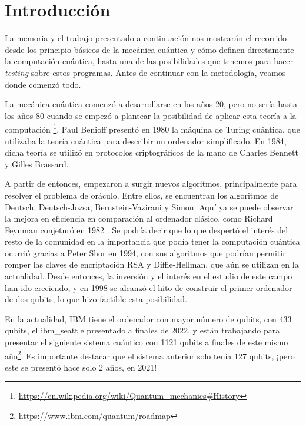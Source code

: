 \cleardoublepage

\chapter{Introducción}
\label{Cap1:Intro}
La memoria y el trabajo presentado a continuación nos mostrarán el recorrido desde los principio básicos de la mecánica cuántica y cómo definen directamente la computación cuántica, hasta una de las posibilidades que tenemos para hacer \textit{testing} sobre estos programas. Antes de continuar con la metodología, veamos donde comenzó todo. \newline

La mecánica cuántica comenzó a desarrollarse en los años 20, pero no sería hasta los años 80 cuando se empezó a plantear la posibilidad de aplicar esta teoría a la computación \cite{B:QuantumScientist:2008} \footnote{\url{https://en.wikipedia.org/wiki/Quantum_mechanics\#History}}. Paul Benioff presentó en 1980 la máquina de Turing cuántica, que utilizaba la teoría cuántica para describir un ordenador simplificado. En 1984, dicha teoría se utilizó en protocolos criptográficos de la mano de Charles Bennett y Gilles Brassard. \newline

A partir de entonces, empezaron a surgir nuevos algoritmos, principalmente para resolver el problema de oráculo. Entre ellos,  se encuentran los algoritmos de Deutsch, Deutsch-Jozsa, Bernstein-Vazirani y Simon. Aquí ya se puede observar la mejora en eficiencia en comparación al ordenador clásico, como Richard Feynman conjeturó en 1982 \cite{AR:Feynman:1982}. Se podría decir que lo que despertó el interés del resto de la comunidad en la importancia que podía tener la computación cuántica ocurrió gracias a Peter Shor en 1994, con sus algoritmos que podrían permitir romper las claves de encriptación RSA y Diffie-Hellman, que aún se utilizan en la actualidad. Desde entonces, la inversión y el interés en el estudio de este campo han ido creciendo, y en 1998 se alcanzó el hito de construir el primer ordenador de dos qubits, lo que hizo factible esta posibilidad.\newline 

En la actualidad, IBM tiene el ordenador con mayor número de qubits, con 433 qubits, el ibm\_seattle presentado a finales de 2022, y están trabajando para presentar el siguiente sistema cuántico con 1121 qubits a finales de este mismo año\footnote{\url{https://www.ibm.com/quantum/roadmap}}. Es importante destacar que el sistema anterior solo tenía 127 qubits, ¡pero este se presentó hace solo 2 años, en 2021! \newline

